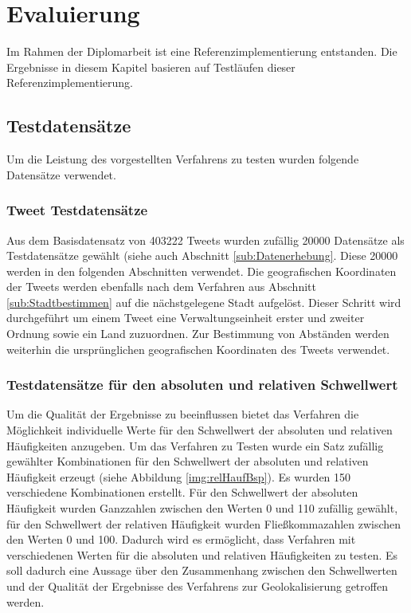 \chapter{Evaluierung} 

	Im Rahmen der Diplomarbeit ist eine Referenzimplementierung entstanden.
	Die Ergebnisse in diesem Kapitel basieren auf Testläufen dieser Referenzimplementierung.

	\section{Testdatensätze}

		Um die Leistung des vorgestellten Verfahrens zu testen wurden folgende Datensätze verwendet. 

		\subsection{Tweet Testdatensätze}

			Aus dem Basisdatensatz von 403222 Tweets wurden zufällig 20000 Datensätze als Testdatensätze gewählt (siehe auch Abschnitt \ref{sub:Datenerhebung}. 
			Diese 20000 werden in den folgenden Abschnitten verwendet.
			Die geografischen Koordinaten der Tweets werden ebenfalls nach dem Verfahren aus Abschnitt \ref{sub:Stadtbestimmen} auf die nächstgelegene Stadt aufgelöst.
			Dieser Schritt wird durchgeführt um einem Tweet eine Verwaltungseinheit erster und zweiter Ordnung sowie ein Land zuzuordnen.
			Zur Bestimmung von Abständen werden weiterhin die ursprünglichen geografischen Koordinaten des Tweets verwendet.  

		\subsection{Testdatensätze für den absoluten und relativen Schwellwert} \label{sub:schwellwerteDatensatz} 

			Um die Qualität der Ergebnisse zu beeinflussen bietet das Verfahren die Möglichkeit individuelle Werte für den Schwellwert der absoluten und relativen Häufigkeiten anzugeben.
			Um das Verfahren zu Testen wurde ein Satz zufällig gewählter Kombinationen für den Schwellwert der absoluten und relativen Häufigkeit erzeugt (siehe Abbildung \ref{img:relHaufBsp}).
			Es wurden 150 verschiedene Kombinationen erstellt.
			Für den Schwellwert der absoluten Häufigkeit wurden Ganzzahlen zwischen den Werten 0 und 110 zufällig gewählt, für den Schwellwert der relativen Häufigkeit wurden Fließkommazahlen zwischen den Werten 0 und 100.
			Dadurch wird es ermöglicht, dass Verfahren mit verschiedenen Werten für die absoluten und relativen Häufigkeiten zu testen.
			Es soll dadurch eine Aussage über den Zusammenhang zwischen den Schwellwerten und der Qualität der Ergebnisse des Verfahrens zur Geolokalisierung getroffen werden.


